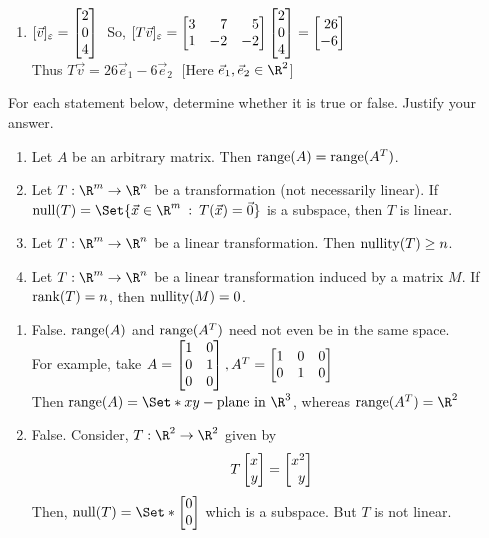 \begin{exercises}
\begin{problist}
\begin{solution}
\begin{enumerate}
    		    \item $[\vec v]_\varepsilon = \mat{2\\0\\4}\;$ So, $[T\vec v]_\varepsilon = \mat{3&7&5\\1&-2&-2}\mat{2\\0\\4}=\mat{26\\-6}$\\
    		
    		    Thus $T\vec v =26\vec e_1-6\vec e_2\;$ [Here $\vec e_1, \vec e_2\in \R^2$]
		    \end{enumerate}
		\end{solution}

		\prob For each statement below, determine whether it is true or false. Justify your answer.
		\begin{enumerate}
			\item Let $A$ be an arbitrary matrix. Then $\operatorname{range}(A)=\operatorname{range}(A^{T})$.

			\item Let $T:\R^{m}\to\R^{n}$ be a transformation (not necessarily
				linear). If $\Null(T)=\Set{\vec x\in\R^m \given T(\vec x)=\vec 0}$
				is a subspace, then $T$ is linear.

			\item Let $T:\R^{m}\to\R^{n}$ be a linear transformation.
				Then $\operatorname{nullity}(T) \geq n$.

			\item Let $T:\R^{m}\to\R^{n}$ be a linear transformation
				induced by a matrix $M$. If
				$\operatorname{rank}(T) = n$, then $\operatorname{nullity}(M) = 0$.
		\end{enumerate}

		\begin{solution}
		    \begin{enumerate}
    		    \item False. $\operatorname{range}(A)$ and $\operatorname{range}(A^T)$ need not even be in the same space.\\
    		    
    		    For example, take $A=\mat{1&0\\0&1\\0&0}, A^T=\mat{1&0&0\\0&1&0}$\\
    		    Then $\Range(A)=\Set*{xy-\text{plane in }\R^3}$, whereas $\Range(A^T)=\R^2$
    		    
    		    \item False. Consider, $T:\R^2\to\R^2$ given by\\
    		    $$T\mat{x\\y}=\mat{x^2\\y}$$
    		    Then, $\Null(T)= \Set*{\mat{0\\0}}$ which is a subspace. But $T$ is not linear.
    		    

\end{enumerate}
\end{solution}
\end{problist}
\end{exercises}
